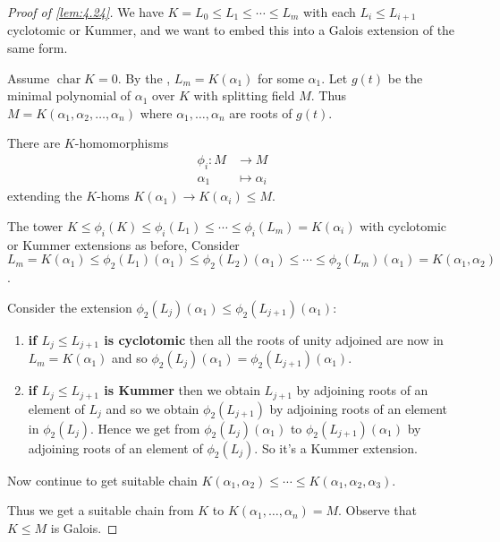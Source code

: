 \documentclass{article}
\DeclareMathOperator{\chara}{char}
\begin{document}
\begin{proof}[Proof of \cref{lem:4.24}]
    We have $K = L_0 \leq L_1 \leq \dotsb \leq L_m$ with each $L_i \leq L_{i+1}$ cyclotomic or Kummer,
    and we want to embed this into a Galois extension of the same form.

    Assume $\chara K = 0$. By the , $L_m = K(\alpha_1)$ for some $\alpha_1$.
    Let $g(t)$ be the minimal polynomial of $\alpha_1$ over $K$ with splitting field $M$.
    Thus $M = K(\alpha_1,\alpha_2,\dotsc,\alpha_n)$ where $\alpha_1, \dotsc, \alpha_n$ are roots of $g(t)$.

    There are $K$-homomorphisms
    \begin{align*}
        \phi_i : M &\longrightarrow M \\
        \alpha_1 &\longmapsto \alpha_i
    \end{align*}
    extending the $K$-homs $K(\alpha_1) \to K(\alpha_i) \leq M$.

    The tower $K \leq \phi_i(K) \leq \phi_i(L_1) \leq \dotsb \leq \phi_i(L_m) = K(\alpha_i)$ with cyclotomic or Kummer extensions as before,
    Consider $L_m = K(\alpha_1) \leq \phi_2(L_1)(\alpha_1) \leq \phi_2(L_2)(\alpha_1) \leq \dotsb \leq \phi_2(L_m)(\alpha_1) = K(\alpha_1,\alpha_2)$.

    Consider the extension $\phi_2(L_j)(\alpha_1) \leq \phi_2(L_{j+1})(\alpha_1)$:
    \begin{enumerate}[label={}]
        \item \textbf{if $L_j \leq L_{j+1}$ is cyclotomic} then all the roots of unity adjoined are now in $L_m = K(\alpha_1)$ and so $\phi_2(L_j)(\alpha_1) = \phi_2(L_{j+1})(\alpha_1)$.
        \item \textbf{if $L_j \leq L_{j+1}$ is Kummer} then we obtain $L_{j+1}$ by adjoining roots of an element of $L_j$ and so we obtain $\phi_2(L_{j+1})$ by adjoining roots of an element in $\phi_2(L_j)$.
            Hence we get from $\phi_2(L_j)(\alpha_1)$ to $\phi_2(L_{j+1})(\alpha_1)$ by adjoining roots of an element of $\phi_2(L_j)$. So it's a Kummer extension.
    \end{enumerate}

    Now continue to get suitable chain $K(\alpha_1,\alpha_2) \leq \dotsb \leq K(\alpha_1, \alpha_2, \alpha_3)$.

    Thus we get a suitable chain from $K$ to $K(\alpha_1, \dotsc, \alpha_n) = M$.
    Observe that $K \leq M$ is Galois.
\end{proof}
\end{document}
